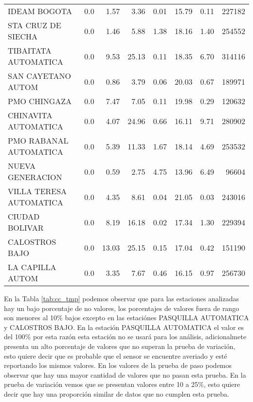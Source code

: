 \begin{enumerate}
\begin{landscape}
\begin{longtable}{p{5cm}rrrrrrr}
            IDEAM BOGOTA &        0.0 &      1.57 &           3.36 &     0.01 &      15.79 &          0.11 &       227182 \\
      STA CRUZ DE SIECHA &        0.0 &      1.46 &           5.88 &     1.38 &      18.16 &          1.40 &       254552 \\
    TIBAITATA AUTOMATICA &        0.0 &      9.53 &          25.13 &     0.11 &      18.35 &          6.70 &       314116 \\
      SAN CAYETANO AUTOM &        0.0 &      0.86 &           3.79 &     0.06 &      20.03 &          0.67 &       189971 \\
            PMO CHINGAZA &        0.0 &      7.47 &           7.05 &     0.11 &      19.98 &          0.29 &       120632 \\
    CHINAVITA AUTOMATICA &        0.0 &      4.07 &          24.96 &     0.66 &      16.11 &          9.71 &       280902 \\
  PMO RABANAL AUTOMATICA &        0.0 &      5.39 &          11.33 &     1.67 &      18.14 &          4.69 &       253532 \\
        NUEVA GENERACION &        0.0 &      0.59 &           2.75 &     4.75 &      13.96 &          6.49 &        96604 \\
 VILLA TERESA AUTOMATICA &        0.0 &      4.35 &           8.61 &     0.04 &      21.05 &          0.03 &       243016 \\
          CIUDAD BOLIVAR &        0.0 &      8.19 &          16.18 &     0.02 &      17.34 &          1.30 &       229394 \\
          CALOSTROS BAJO &        0.0 &     13.03 &          25.15 &     0.15 &      17.04 &          0.42 &       151190 \\
        LA CAPILLA AUTOM &        0.0 &      3.35 &           7.67 &     0.46 &      16.15 &          0.97 &       256730 \\
\end{longtable}
\end{landscape}

En la Tabla \ref{tab:cc_tmp} podemos observar que para las estaciones analizadas hay un bajo porcentaje de no valores, los porcentajes de valores fuera de rango son menores al 10\% bajos excepto en las estaciónes PASQUILLA AUTOMATICA y CALOSTROS BAJO. En la estación PASQUILLA AUTOMATICA el valor es del 100\% por esta razón esta estación no se usará para los análisis, adicionalmete presenta un alto porcentaje de valores que no superan la prueba de variación, esto quiere decir que es probable que el sensor se encuentre averiado y esté reportando los mismos valores. En los valores de la prueba de paso podemos observar que hay una mayor cantidad de valores que no pasan esta prueba. En la prueba de variación vemos que se presentan valores entre 10 a 25\%, esto quiere decir que hay una proporción similar de datos que no cumplen esta prueba.

\end{enumerate}


